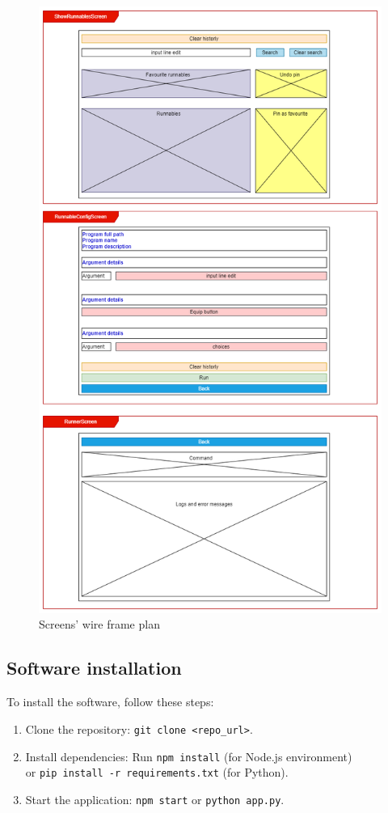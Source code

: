\documentclass{article}
\begin{document}
\begin{figure}[h]
    \centering
    \includegraphics[width=0.9\linewidth]{img/wire_frame_plan.drawio.png}
    \caption{Screens' wire frame plan}
    \label{fig:viewwireframe}
\end{figure}

\FloatBarrier

\subsection{Software installation}

To install the software, follow these steps:

\begin{enumerate}
    \item Clone the repository\@: \texttt{git clone <repo\_url>}.
    \item Install dependencies\@: Run \texttt{npm install} (for Node.js environment)\\
                                  or \texttt{pip install -r requirements.txt} (for Python).
    \item Start the application\@: \texttt{npm start} or \texttt{python app.py}.
\end{enumerate}
\end{document}
